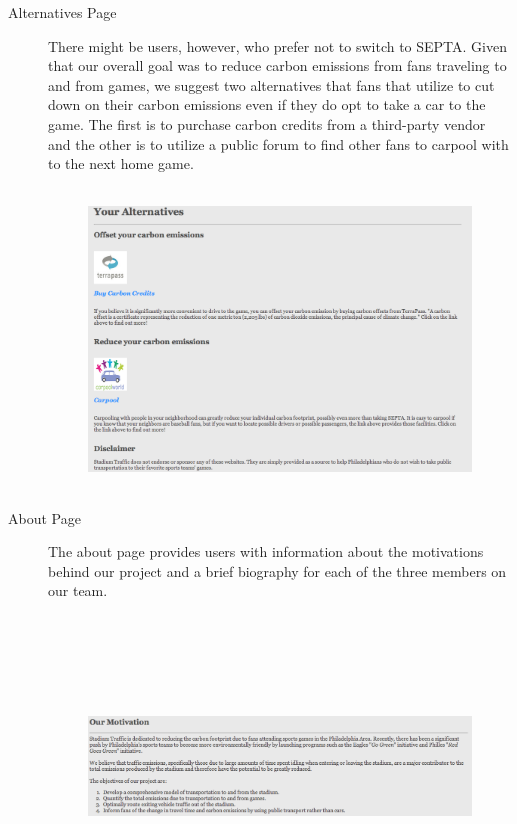 \begin{description}
    \item[Alternatives Page] There might be users, however, who prefer
  not to switch to SEPTA. Given that our overall goal was to reduce
  carbon emissions from fans traveling to and from games, we suggest
  two alternatives that fans that utilize to cut down on their carbon
  emissions even if they do opt to take a car to the game. The first
  is to purchase carbon credits from a third-party vendor and the
  other is to utilize a public forum to find other fans to carpool
  with to the next home game.

  \begin{figure}[htp]
    \centering
    \includegraphics[height=8cm]{graphics/website/alternatives.png}
    \caption{}
  \end{figure}

    \item[About Page] The about page provides users with information
  about the motivations behind our project and a brief biography for
  each of the three members on our team.

  \begin{figure}[htp]
    \centering
    \includegraphics[height=8cm]{graphics/website/motivation.png}
    \caption{}
  \end{figure}


\end{description}
